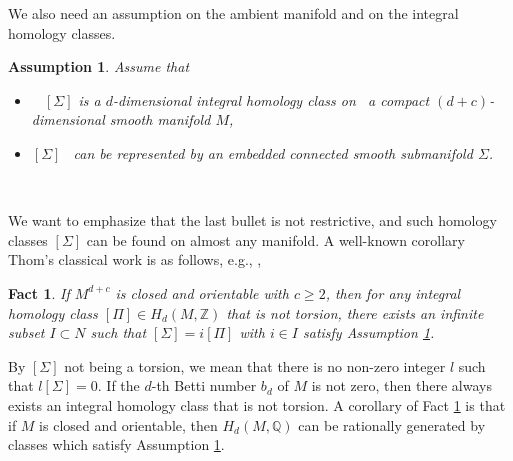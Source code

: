 \documentclass[11pt,a4paper]{amsart}
\numberwithin{equation}{section}
\newcommand{\Si}{\Sigma}
\newcommand{\s}{\subset}
\newcommand{\Z}{\mathbb{Z}}
\newcommand{\Q}{\mathbb{Q}}
\theoremstyle{plain}
\newtheorem{fact}[exam]{Fact}
\newtheorem{assump}[exam]{Assumption}
\theoremstyle{definition}
\numberwithin{equation}{subsection}
\begin{document}
	We also need an assumption on the ambient manifold and on the integral homology classes.
	\begin{assump}	\label{assumpbs}
		Assume that
		\begin{itemize}%
			\item   $[\Si]$ is a $d$-dimensional integral homology class on  a compact $(d+c)$-dimensional smooth manifold $M$,
			\item $[\Si]$  can be represented by an embedded connected smooth submanifold $\Si$.
		\end{itemize}  
	\end{assump}
	We want to emphasize that the last bullet is not restrictive, and such homology classes $[\Si]$ can be found on almost any manifold. A well-known corollary Thom's classical work \cite{RT} is as follows, e.g., \cite[Lemma 2.1.2]{ZLh},\begin{fact}\label{fctthom}If $M^{d+c}$ is closed and orientable with $c\ge 2$, then for any integral homology class $[\Pi]\in H_d(M,\Z)$ that is not torsion, there exists an infinite subset $I\s N$ such that $[\Si]=i[\Pi]$ with $i\in I$ satisfy Assumption \ref{assumpbs}. 
	\end{fact}By $[\Si]$ not being a torsion, we mean that there is no non-zero integer $l$ such that $l[\Si]=0.$ If the $d$-th Betti number $b_d$ of $M$ is not zero, then there always exists an integral homology class that is not torsion. A corollary of Fact \ref{fctthom} is that if $M$ is closed and orientable, then $H_d(M,\Q)$ can be rationally generated by classes which satisfy Assumption \ref{assumpbs}.  
	
\end{document}
